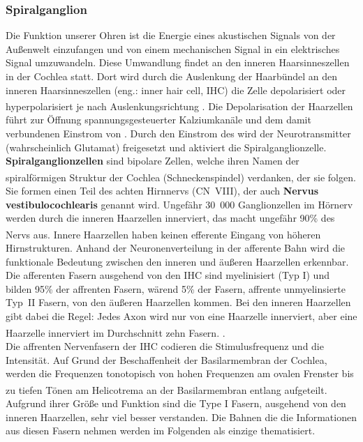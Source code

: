 \documentclass[12pt,a4paper,pdftex]{article}
\begin{document}
\subsubsection*{Spiralganglion}
Die Funktion unserer Ohren ist die Energie eines akustischen Signals von der Außenwelt einzufangen und von einem mechanischen Signal in ein elektrisches Signal umzuwandeln. Diese Umwandlung findet an den inneren Haarsinneszellen in der Cochlea statt. Dort wird durch die Auslenkung der Haarbündel an den inneren Haarsinneszellen (eng.: inner hair cell, IHC) die Zelle depolarisiert oder hyperpolarisiert je nach Auslenkungsrichtung \textsuperscript{\cite[30]{kandel2013principles}}. Die Depolarisation der Haarzellen führt zur Öffnung spannungsgesteuerter Kalziumkanäle und dem damit verbundenen Einstrom von . Durch den Einstrom des  wird der Neurotransmitter (wahrscheinlich Glutamat) freigesetzt und aktiviert die Spiralganglionzelle. \textbf{Spiralganglionzellen} sind bipolare Zellen, welche ihren Namen der spiralförmigen Struktur der Cochlea (Schneckenspindel) verdanken, der sie folgen\textsuperscript{\cite[11]{neurowissenschaften_baer}}. Sie formen einen Teil des achten Hirnnervs (CN~VIII), der auch \textbf{Nervus vestibulocochlearis} genannt wird. Ungefähr 30~000 Ganglionzellen im Hörnerv werden durch die inneren Haarzellen innerviert, das macht ungefähr 90\% des Nervs aus\textsuperscript{\cite[30]{kandel2013principles}}. 
Innere Haarzellen haben keinen efferente Eingang von höheren Hirnstrukturen. Anhand der Neuronenverteilung in der afferente Bahn wird die funktionale Bedeutung zwischen den inneren und äußeren Haarzellen erkennbar. Die afferenten Fasern ausgehend von den IHC sind myelinisiert (Typ I) und bilden 95\% der affrenten Fasern, wärend 5\% der Fasern, affrente unmyelinsierte Typ~II Fasern, von den äußeren Haarzellen kommen. Bei den inneren Haarzellen gibt dabei die Regel: Jedes Axon wird nur von eine Haarzelle innerviert, aber eine Haarzelle innerviert im Durchschnitt zehn Fasern.  \textsuperscript{\cite[30]{kandel2013principles}}.   
\\
\noindent Die affrenten Nervenfasern der IHC codieren die Stimulusfrequenz und die Intensität. Auf Grund der Beschaffenheit der Basilarmembran der Cochlea, werden die Frequenzen tonotopisch von hohen Frequenzen am ovalen Frenster bis zu tiefen Tönen am Helicotrema an der Basilarmembran entlang aufgeteilt\textsuperscript{\cite[29]{paxinos2014rat}}. Aufgrund ihrer Größe und Funktion sind die Type I Fasern, ausgehend von den inneren Haarzellen, sehr viel besser verstanden. Die Bahnen die die Informationen aus diesen Fasern nehmen werden im Folgenden als einzige thematisiert.
\end{document}
